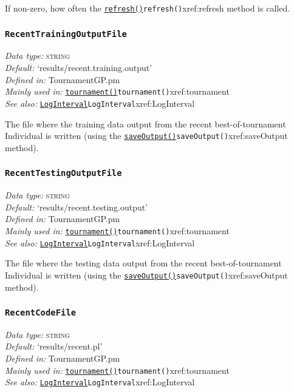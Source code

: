 \documentclass[a4paper]{article}
\begin{document}
If non-zero, how often the \hyperref[no]{\texttt{refresh()}}{\texttt{refresh()}}{xref:refresh} method is called.

\subsubsection{\texttt{RecentTrainingOutputFile}}\label{xref:RecentTrainingOutputFile}
\begin{flushleft}
\textit{Data type:} \textsc{string}\\
\textit{Default:} `results/recent.training.output'\\
\textit{Defined in:} TournamentGP.pm\\
\textit{Mainly used in:} \hyperref[no]{\texttt{tournament()}}{\texttt{tournament()}}{xref:tournament}\\
\textit{See also:} \hyperref[no]{\texttt{LogInterval}}{\texttt{LogInterval}}{xref:LogInterval}
\end{flushleft}

The file where the training data output from the recent
best-of-tournament Individual is written (using the
\hyperref[no]{\texttt{saveOutput()}}{\texttt{saveOutput()}}{xref:saveOutput} method).

\subsubsection{\texttt{RecentTestingOutputFile}}\label{xref:RecentTestingOutputFile}
\begin{flushleft}
\textit{Data type:} \textsc{string}\\
\textit{Default:} `results/recent.testing.output'\\
\textit{Defined in:} TournamentGP.pm\\
\textit{Mainly used in:} \hyperref[no]{\texttt{tournament()}}{\texttt{tournament()}}{xref:tournament}\\
\textit{See also:} \hyperref[no]{\texttt{LogInterval}}{\texttt{LogInterval}}{xref:LogInterval}
\end{flushleft}

The file where the testing data output from the recent
best-of-tournament Individual is written (using the
\hyperref[no]{\texttt{saveOutput()}}{\texttt{saveOutput()}}{xref:saveOutput} method).

\subsubsection{\texttt{RecentCodeFile}}\label{xref:RecentCodeFile}
\begin{flushleft}
\textit{Data type:} \textsc{string}\\
\textit{Default:} `results/recent.pl'\\
\textit{Defined in:} TournamentGP.pm\\
\textit{Mainly used in:} \hyperref[no]{\texttt{tournament()}}{\texttt{tournament()}}{xref:tournament}\\
\textit{See also:} \hyperref[no]{\texttt{LogInterval}}{\texttt{LogInterval}}{xref:LogInterval}
\end{flushleft}
\end{document}
